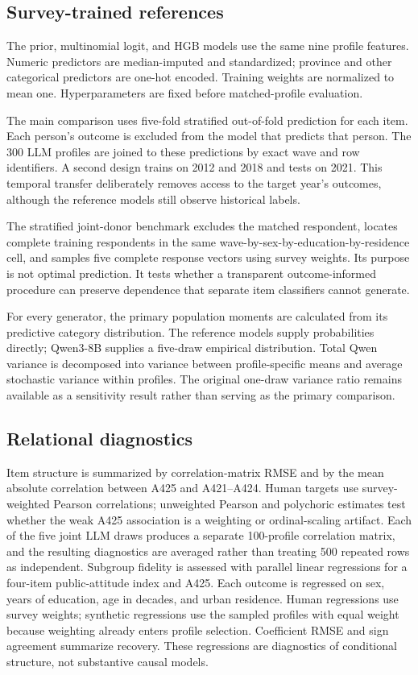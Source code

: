 \documentclass[10pt,twocolumn]{article}
\newcommand{\HGB}{HGB\xspace}
\begin{document}
\subsection{Survey-trained references}

The prior, multinomial logit, and \HGB models use the same nine profile features. Numeric predictors
are median-imputed and standardized; province and other categorical predictors are one-hot encoded.
Training weights are normalized to mean one. Hyperparameters are fixed before matched-profile
evaluation.

The main comparison uses five-fold stratified out-of-fold prediction for each item. Each person's
outcome is excluded from the model that predicts that person. The 300 LLM profiles are joined to
these predictions by exact wave and row identifiers. A second design trains on 2012 and 2018 and
tests on 2021. This temporal transfer deliberately removes access to the target year's outcomes,
although the reference models still observe historical labels.

The stratified joint-donor benchmark excludes the matched respondent, locates complete training
respondents in the same wave-by-sex-by-education-by-residence cell, and samples five complete
response vectors using survey weights. Its purpose is not optimal prediction. It tests whether a
transparent outcome-informed procedure can preserve dependence that separate item classifiers
cannot generate.

For every generator, the primary population moments are calculated from its predictive category
distribution. The reference models supply probabilities directly; Qwen3-8B supplies a five-draw
empirical distribution. Total Qwen variance is decomposed into variance between profile-specific
means and average stochastic variance within profiles. The original one-draw variance ratio remains
available as a sensitivity result rather than serving as the primary comparison.

\subsection{Relational diagnostics}

Item structure is summarized by correlation-matrix RMSE and by the mean absolute correlation between
A425 and A421--A424. Human targets use survey-weighted Pearson correlations; unweighted Pearson and
polychoric estimates test whether the weak A425 association is a weighting or ordinal-scaling
artifact. Each of the five joint LLM draws produces a separate 100-profile correlation matrix, and
the resulting diagnostics are averaged rather than treating 500 repeated rows as independent.
Subgroup fidelity is assessed with parallel linear regressions for a four-item
public-attitude index and A425. Each outcome is regressed on sex, years of education, age in decades,
and urban residence. Human regressions use survey weights; synthetic regressions use the sampled
profiles with equal weight because weighting already enters profile selection. Coefficient RMSE and
sign agreement summarize recovery. These regressions are diagnostics of conditional structure, not
substantive causal models.
\end{document}
